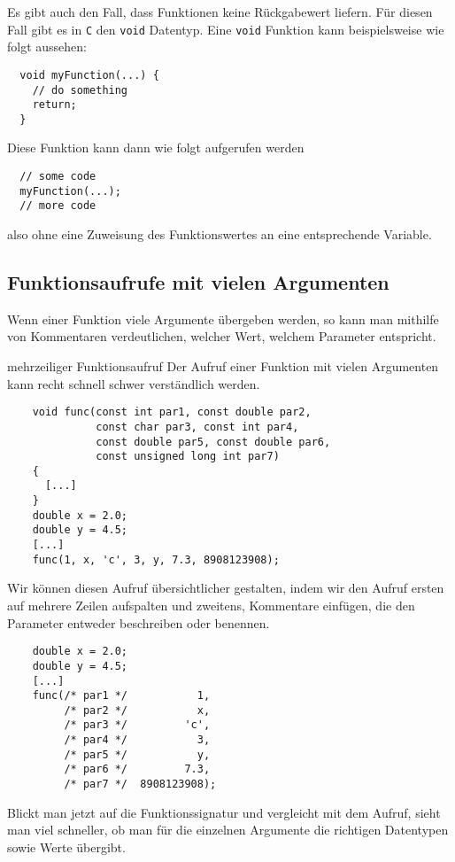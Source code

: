 Es gibt auch den Fall, dass Funktionen keine Rückgabewert liefern.
Für diesen Fall gibt es in \texttt{C} den \verb|void| Datentyp.
Eine \verb|void| Funktion kann beispielsweise wie folgt aussehen:
\begin{lstlisting}
  void myFunction(...) {
    // do something
    return;
  }
\end{lstlisting}
Diese Funktion kann dann wie folgt aufgerufen werden
\begin{lstlisting}
  // some code
  myFunction(...);
  // more code
\end{lstlisting}
also ohne eine Zuweisung des Funktionswertes an eine entsprechende Variable.

\subsection{Funktionsaufrufe mit vielen Argumenten}

Wenn einer Funktion viele Argumente übergeben werden, so kann man mithilfe von Kommentaren verdeutlichen, welcher Wert, welchem Parameter entspricht.

\begin{myalertblock}{mehrzeiliger Funktionsaufruf}
  Der Aufruf einer Funktion mit vielen Argumenten kann recht schnell schwer verständlich werden.
  \begin{lstlisting}
    void func(const int par1, const double par2, 
              const char par3, const int par4, 
              const double par5, const double par6,
              const unsigned long int par7)
    {
      [...]
    }
    double x = 2.0;
    double y = 4.5;
    [...]
    func(1, x, 'c', 3, y, 7.3, 8908123908);
  \end{lstlisting}
  Wir können diesen Aufruf übersichtlicher gestalten, indem wir den Aufruf ersten auf mehrere Zeilen aufspalten und zweitens, Kommentare einfügen, die den Parameter entweder beschreiben oder benennen.
  \begin{lstlisting}
    double x = 2.0;
    double y = 4.5;
    [...]
    func(/* par1 */           1,
         /* par2 */           x,
         /* par3 */         'c',
         /* par4 */           3,
         /* par5 */           y,
         /* par6 */         7.3,
         /* par7 */  8908123908);
  \end{lstlisting}
  Blickt man jetzt auf die Funktionssignatur und vergleicht mit dem Aufruf, sieht man viel schneller, ob man für die einzelnen Argumente die richtigen Datentypen sowie Werte übergibt.
\end{myalertblock}

\endinput
